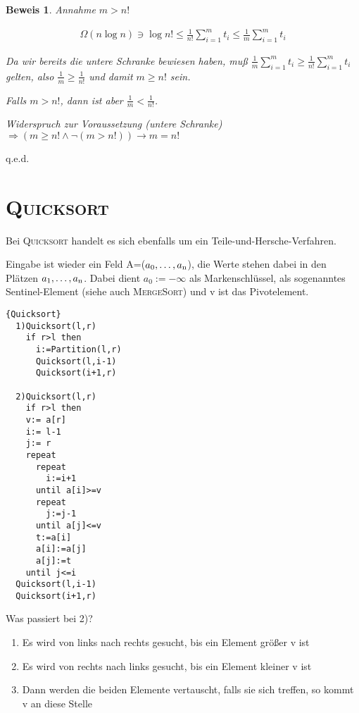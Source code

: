 \documentclass[ngerman,draft,parskip=half*,twoside]{scrreprt}
\theoremstyle{break}
\newtheorem{beweis}{Beweis}
\begin{document}
\begin{beweis}
Annahme $m>n!$

\begin{gather*}
\Omega(n  \log n) \ni \log n!\leq\frac{1}{n!}  \sum_{i=1}^{m}t_i \leq\frac{1}{m}  \sum_{i=1}^{m}t_i
\end{gather*}

Da wir bereits die untere Schranke bewiesen haben, muß \(\frac{1}{m}  \sum_{i=1}^{m}t_i \geq \frac{1}{n!}  \sum_{i=1}^{m}t_i\) gelten,
also \(\frac{1}{m} \geq \frac{1}{n!}\) und damit \(m \geq n!\) sein.

Falls \(m>n!\), dann ist aber \(\frac{1}{m} < \frac{1}{n!}\).

Widerspruch zur Voraussetzung (untere Schranke) \(\Rightarrow (m \geq n! \wedge \lnot (m>n!)) \rightarrow m=n!\)
\end{beweis}
\hfill q.e.d.

\section{\textsc{Quicksort}}
Bei \textsc{Quicksort} handelt es sich ebenfalls um ein Teile-und-Hersche-Verfahren.

Eingabe ist wieder ein Feld A=(\(a_0, \ldots, a_{\textup{n}}\)), die Werte stehen dabei in den Plätzen \(a_1, \ldots, a_{\textup{n}}\).
Dabei dient $a_0:=-\infty$ als Markenschlüssel, als sogenanntes Sentinel-Element (siehe auch \textsc{MergeSort}) und
v ist das Pivotelement.

\begin{Algorithmus}[H]
\begin{lstlisting}[frame=tlrb, mathescape=true, title=\textsc{Quicksort}, gobble=2]{Quicksort}
  1)Quicksort(l,r)
    if r>l then
      i:=Partition(l,r)
      Quicksort(l,i-1)
      Quicksort(i+1,r) 

  2)Quicksort(l,r)
    if r>l then
    v:= a[r] 
    i:= l-1 
    j:= r
    repeat
      repeat 
        i:=i+1 
      until a[i]>=v
      repeat 
        j:=j-1 
      until a[j]<=v
      t:=a[i]  
      a[i]:=a[j] 
      a[j]:=t
    until j<=i
  Quicksort(l,i-1)
  Quicksort(i+1,r) 
\end{lstlisting}
\end{Algorithmus}

Was passiert bei 2)?
\begin{enumerate}
\item Es wird von links nach rechts gesucht, bis ein Element größer v ist
\item Es wird von rechts nach links gesucht, bis ein Element kleiner v ist
\item Dann werden die beiden Elemente vertauscht, falls sie sich treffen, so kommt v an diese Stelle
\end{enumerate}
\end{document}
